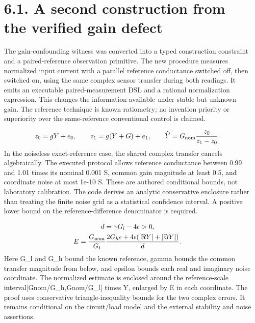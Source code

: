 \documentclass[10pt,letterpaper]{article}
\begin{document}
\section*{\color{accent}6.1. A second construction from the verified gain defect}
The gain-confounding witness was converted into a typed construction constraint and a paired-reference observation primitive. The new procedure measures normalized input current with a parallel reference conductance switched off, then switched on, using the same complex sensor transfer during both readings. It emits an executable paired-measurement DSL and a rational normalization expression. This changes the information available under stable but unknown gain. The reference technique is known ratiometry; no invention priority or superiority over the same-reference conventional control is claimed.\par
\[ z_0=gY+e_0,\qquad z_1=g(Y+G)+e_1,\qquad \widehat Y=G_{\rm nom}\frac{z_0}{z_1-z_0}. \]
In the noiseless exact-reference case, the shared complex transfer cancels algebraically. The executed protocol allows reference conductance between 0.99 and 1.01 times its nominal 0.001 S, common gain magnitude at least 0.5, and coordinate noise at most 1e-10 S. These are authored conditional bounds, not laboratory calibration. The code derives an analytic conservative enclosure rather than treating the finite noise grid as a statistical confidence interval. A positive lower bound on the reference-difference denominator is required.\par
\[ \begin{gathered}d=\gamma G_l-4\epsilon>0,\\E=\frac{G_{\rm nom}}{G_l}\frac{2G_h\epsilon+4\epsilon(|\Re Y|+|\Im Y|)}{d}.\end{gathered} \]
Here G\_\allowbreak{}l and G\_\allowbreak{}h bound the known reference, gamma bounds the common transfer magnitude from below, and epsilon bounds each real and imaginary noise coordinate. The normalized estimate is enclosed around the reference-scale interval[Gnom/G\_\allowbreak{}h,Gnom/G\_\allowbreak{}l] times Y, enlarged by E in each coordinate. The proof uses conservative triangle-inequality bounds for the two complex errors. It remains conditional on the circuit/load model and the external stability and noise assertions.\par
\begingroup\small\setlength{\tabcolsep}{4pt}\renewcommand{\arraystretch}{1.18}
\end{document}
